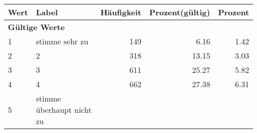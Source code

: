      \begin{longtable}{lXrrr}
     \toprule
     \textbf{Wert} & \textbf{Label} & \textbf{Häufigkeit} & \textbf{Prozent(gültig)} & \textbf{Prozent} \\
     \endhead
     \midrule
     \multicolumn{5}{l}{\textbf{Gültige Werte}}\\

     1 &
     \multicolumn{1}{X}{ stimme sehr zu   } &


       \num{149} &
       \num[round-mode=places,round-precision=2]{6,16} &
         \num[round-mode=places,round-precision=2]{1,42} \\

     2 &
     \multicolumn{1}{X}{ 2   } &


       \num{318} &
       \num[round-mode=places,round-precision=2]{13,15} &
         \num[round-mode=places,round-precision=2]{3,03} \\

     3 &
     \multicolumn{1}{X}{ 3   } &


       \num{611} &
       \num[round-mode=places,round-precision=2]{25,27} &
         \num[round-mode=places,round-precision=2]{5,82} \\

     4 &
     \multicolumn{1}{X}{ 4   } &


       \num{662} &
       \num[round-mode=places,round-precision=2]{27,38} &
         \num[round-mode=places,round-precision=2]{6,31} \\

     5 &
     \multicolumn{1}{X}{ stimme überhaupt nicht zu   } &



\end{longtable}
